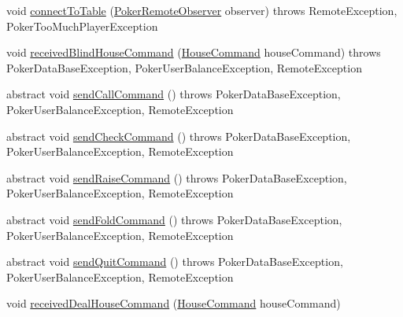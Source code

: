 \begin{DoxyCompactItemize}
\item 
void \hyperlink{classhu_1_1elte_1_1bfw1p6_1_1poker_1_1client_1_1model_1_1_abstract_main_game_model_a4c75145dda56e2a312587c2fd6dc6b4b}{connect\+To\+Table} (\hyperlink{interfacehu_1_1elte_1_1bfw1p6_1_1poker_1_1client_1_1observer_1_1_poker_remote_observer}{Poker\+Remote\+Observer} observer)  throws Remote\+Exception, Poker\+Too\+Much\+Player\+Exception 
\item 
void \hyperlink{classhu_1_1elte_1_1bfw1p6_1_1poker_1_1client_1_1model_1_1_abstract_main_game_model_a66c4e0185c70bb33da4fe8a553c7c1a6}{received\+Blind\+House\+Command} (\hyperlink{classhu_1_1elte_1_1bfw1p6_1_1poker_1_1command_1_1_house_command}{House\+Command} house\+Command)  throws Poker\+Data\+Base\+Exception, Poker\+User\+Balance\+Exception, Remote\+Exception 
\item 
abstract void \hyperlink{classhu_1_1elte_1_1bfw1p6_1_1poker_1_1client_1_1model_1_1_abstract_main_game_model_a91e11c7d9c4178ee671db224b7b1f680}{send\+Call\+Command} ()  throws Poker\+Data\+Base\+Exception, Poker\+User\+Balance\+Exception, Remote\+Exception
\item 
abstract void \hyperlink{classhu_1_1elte_1_1bfw1p6_1_1poker_1_1client_1_1model_1_1_abstract_main_game_model_a501f638637ade1fd7cba7c967f4a646f}{send\+Check\+Command} ()  throws Poker\+Data\+Base\+Exception, Poker\+User\+Balance\+Exception, Remote\+Exception
\item 
abstract void \hyperlink{classhu_1_1elte_1_1bfw1p6_1_1poker_1_1client_1_1model_1_1_abstract_main_game_model_adeedc8f76a94345f35c9271105abe272}{send\+Raise\+Command} ()  throws Poker\+Data\+Base\+Exception, Poker\+User\+Balance\+Exception, Remote\+Exception
\item 
abstract void \hyperlink{classhu_1_1elte_1_1bfw1p6_1_1poker_1_1client_1_1model_1_1_abstract_main_game_model_a15009fd2b3ef6ec60f5c7cf8ec2e6cfe}{send\+Fold\+Command} ()  throws Poker\+Data\+Base\+Exception, Poker\+User\+Balance\+Exception, Remote\+Exception
\item 
abstract void \hyperlink{classhu_1_1elte_1_1bfw1p6_1_1poker_1_1client_1_1model_1_1_abstract_main_game_model_a4f48d2bd2f279e62411011aec4cf932c}{send\+Quit\+Command} ()  throws Poker\+Data\+Base\+Exception, Poker\+User\+Balance\+Exception, Remote\+Exception
\item 
void \hyperlink{classhu_1_1elte_1_1bfw1p6_1_1poker_1_1client_1_1model_1_1_abstract_main_game_model_a1684432398d4b25e307e1ae79c76af1d}{received\+Deal\+House\+Command} (\hyperlink{classhu_1_1elte_1_1bfw1p6_1_1poker_1_1command_1_1_house_command}{House\+Command} house\+Command)

\end{DoxyCompactItemize}
